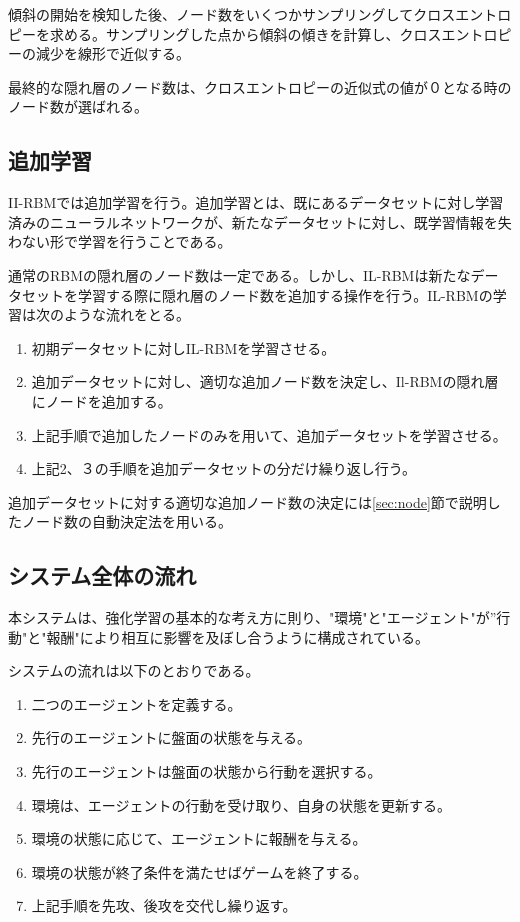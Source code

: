 傾斜の開始を検知した後、ノード数をいくつかサンプリングしてクロスエントロピーを求める。サンプリングした点から傾斜の傾きを計算し、クロスエントロピーの減少を線形で近似する。

最終的な隠れ層のノード数は、クロスエントロピーの近似式の値が０となる時のノード数が選ばれる。

\subsection{追加学習}
II-RBMでは追加学習を行う。追加学習とは、既にあるデータセットに対し学習済みのニューラルネットワークが、新たなデータセットに対し、既学習情報を失わない形で学習を行うことである。

通常のRBMの隠れ層のノード数は一定である。しかし、IL-RBMは新たなデータセットを学習する際に隠れ層のノード数を追加する操作を行う。IL-RBMの学習は次のような流れをとる。

\begin{enumerate}
  \item 初期データセットに対しIL-RBMを学習させる。
  \item 追加データセットに対し、適切な追加ノード数を決定し、Il-RBMの隠れ層にノードを追加する。
  \item 上記手順で追加したノードのみを用いて、追加データセットを学習させる。
  \item 上記2、３の手順を追加データセットの分だけ繰り返し行う。
\end{enumerate}

追加データセットに対する適切な追加ノード数の決定には\ref{sec:node}節で説明したノード数の自動決定法を用いる。



\subsection{システム全体の流れ}



本システムは、強化学習の基本的な考え方に則り、"環境"と"エージェント"が”行動"と"報酬"により相互に影響を及ぼし合うように構成されている。

システムの流れは以下のとおりである。

\begin{enumerate}
  \item 二つのエージェントを定義する。
  \item 先行のエージェントに盤面の状態を与える。
  \item 先行のエージェントは盤面の状態から行動を選択する。
  \item 環境は、エージェントの行動を受け取り、自身の状態を更新する。
  \item 環境の状態に応じて、エージェントに報酬を与える。
  \item 環境の状態が終了条件を満たせばゲームを終了する。
  \item 上記手順を先攻、後攻を交代し繰り返す。
\end{enumerate}



